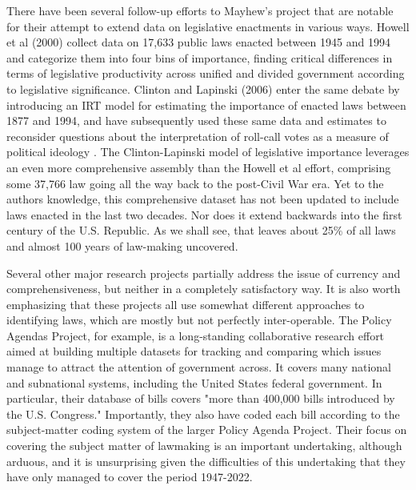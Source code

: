 \documentclass[fleqn,10pt]{wlscirep}
\begin{document}
 There have been several follow-up efforts to Mayhew's project that are notable for their attempt to extend data on legislative enactments in various ways. Howell et al (2000) collect data on 17,633 public laws enacted between 1945 and 1994 and categorize them into four bins of importance, finding critical differences in terms of legislative productivity across unified and divided government according to legislative significance. \cite{Howell2000} Clinton and Lapinski (2006) enter the same debate by introducing an IRT model for estimating the importance of enacted laws between 1877 and 1994,\cite{clinton2006measuring} and have subsequently used these same data and estimates to reconsider questions about the interpretation of roll-call votes as a measure of political ideology \cite{clinton2008laws,lapinski2008,bateman2017}. The Clinton-Lapinski model of legislative importance leverages an even more comprehensive assembly than the Howell et al effort, comprising some 37,766 law going all the way back to the post-Civil War era. Yet to the authors knowledge, this comprehensive dataset has not been updated to include laws enacted in the last two decades. Nor does it extend backwards into the first century of the U.S. Republic. As we shall see, that leaves about 25\% of all laws and almost 100 years of law-making uncovered.

Several other major research projects partially address the issue of currency and comprehensiveness, but neither in a completely satisfactory way. It is also worth emphasizing that these projects all use somewhat different approaches to identifying laws, which are mostly but not perfectly inter-operable. The Policy Agendas Project, for example, is a long-standing collaborative research effort aimed at building multiple datasets for tracking and comparing which issues manage to attract the attention of government across. It covers many national and subnational systems, including the United States federal government. In particular, their database of bills covers "more than 400,000 bills introduced by the U.S. Congress." Importantly, they also have coded each bill according to the subject-matter coding system of the larger Policy Agenda Project. Their focus on covering the subject matter of lawmaking is an important undertaking, although arduous, and it is unsurprising given the difficulties of this undertaking that they have only managed to cover the period 1947-2022. 
\end{document}
